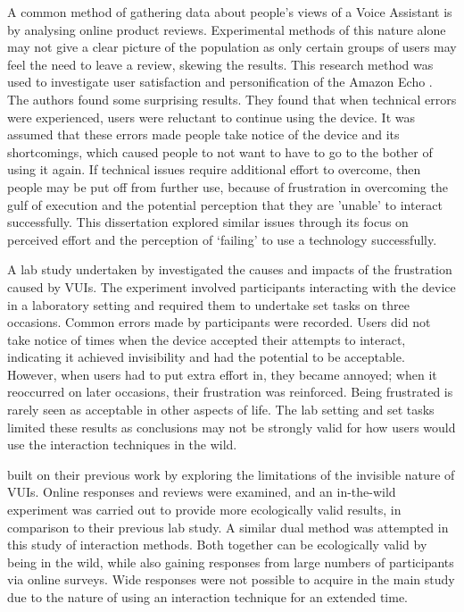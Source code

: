 \documentclass{l4proj}
\begin{document}
A common method of gathering data about people’s views of a Voice Assistant is by analysing online product reviews. Experimental methods of this nature alone may not give a clear picture of the population as only certain groups of users may feel the need to leave a review, skewing the results. This research method was used to investigate user satisfaction and personification of the Amazon Echo \citep{purington_alexa_2017}. The authors found some surprising results. They found that when technical errors were experienced, users were reluctant to continue using the device. It was assumed that these errors made people take notice of the device and its shortcomings, which caused people to not want to have to go to the bother of using it again.  If technical issues require additional effort to overcome, then people may be put off from further use, because of frustration in overcoming the gulf of execution and the potential perception that they are 'unable' to interact successfully. This dissertation explored similar issues through its focus on perceived effort and the perception of `failing' to use a technology successfully.

A lab study undertaken by \citet{myers_patterns_2018} investigated the causes and impacts of the frustration caused by VUIs. The experiment involved participants interacting with the device in a laboratory setting and required them to undertake set tasks on three occasions. Common errors made by participants were recorded. Users did not take notice of times when the device accepted their attempts to interact, indicating it achieved invisibility and had the potential to be acceptable. However, when users had to put extra effort in, they became annoyed; when it reoccurred on later occasions, their frustration was reinforced. Being frustrated is rarely seen as acceptable in other aspects of life. The lab setting and set tasks limited these results as conclusions may not be strongly valid for how users would use the interaction techniques in the wild.

\citet{myers_impact_2019} built on their previous work by exploring the limitations of the invisible nature of VUIs. Online responses and reviews were examined, and an in-the-wild experiment was carried out to provide more ecologically valid results, in comparison to their previous lab study. A similar dual method was attempted in this study of interaction methods. Both together can be ecologically valid by being in the wild, while also gaining responses from large numbers of participants via online surveys. Wide responses were not possible to acquire in the main study due to the nature of using an interaction technique for an extended time.
\end{document}
